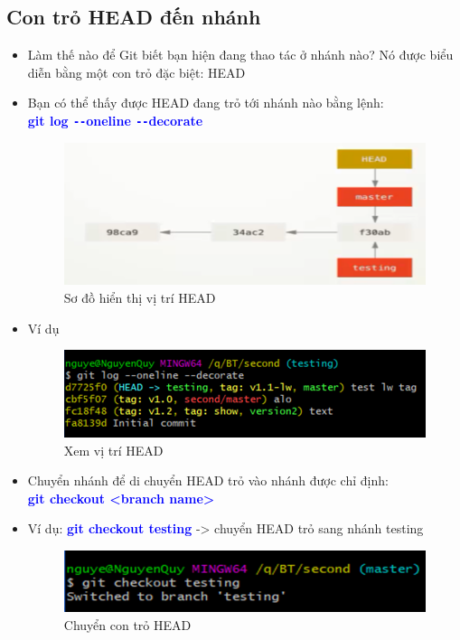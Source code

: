\documentclass[12pt,a4paper]{report}
\begin{document}
\subsection{Con trỏ HEAD đến nhánh}
\begin{itemize}
\item Làm thế nào để Git biết bạn hiện đang thao tác ở nhánh nào? Nó được biểu diễn bằng một con trỏ đặc biệt: HEAD
\item Bạn có thể thấy được HEAD đang trỏ tới nhánh nào bằng lệnh:\\ \textcolor{blue}{\bf git log \texttt{-{}-}oneline \texttt{-{}-}decorate}

\begin{figure}[!ht]
	\centering
	\includegraphics[width=0.8\linewidth]{screenshot052}
	\caption{Sơ đồ hiển thị vị trí HEAD}
	\label{fig:screenshot052}
	\end{figure}

\item Ví dụ

\begin{figure}[!ht]
	\centering
	\includegraphics[width=0.8\linewidth]{screenshot053}
	\caption{Xem vị trí HEAD}
	\label{fig:screenshot053}
	\end{figure}

\item Chuyển nhánh để di chuyển HEAD trỏ vào nhánh được chỉ định:\\ \textcolor{blue}{\bf git checkout <branch name>} 
\item Ví dụ: \textcolor{blue}{\bf git checkout testing} -> chuyển HEAD trỏ sang nhánh testing

\begin{figure}[!ht]
	\centering
	\includegraphics[width=0.8\linewidth]{screenshot054}
\caption{Chuyển con trỏ HEAD}
	\label{fig:screenshot054}
\end{figure}

\end{itemize}
\end{document}
